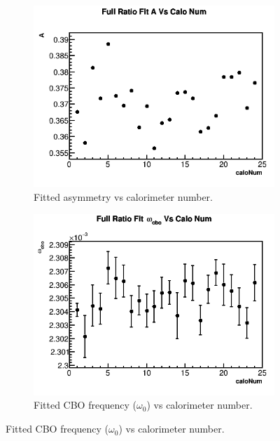 \begin{figure}[h]
	    \vspace{4mm}
	    \begin{subfigure}[t]{0.4\textwidth}
		    \centering
			\includegraphics[width=\textwidth]{RatioCBOFit_A_Vs_Calo_Canv}
		    \caption{Fitted asymmetry vs calorimeter number.}
	    \end{subfigure}
	    \hspace{4mm}
	    \begin{subfigure}[t]{0.4\textwidth}
		    \centering
			\includegraphics[width=\textwidth]{RatioCBOFit_omega_cbo_Vs_Calo_Canv}
		    \caption{Fitted CBO frequency ($\omega_{0}$) vs calorimeter number.}
	    \end{subfigure}%

\end{figure}

